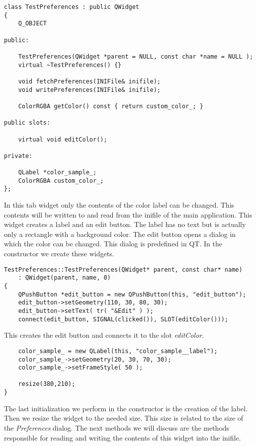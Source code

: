 \begin{verbatim}
class TestPreferences : public QWidget
{
	Q_OBJECT
		
public:

	TestPreferences(QWidget *parent = NULL, const char *name = NULL );
	virtual ~TestPreferences() {}
	
	void fetchPreferences(INIFile& inifile);
	void writePreferences(INIFile& inifile);

	ColorRGBA getColor() const { return custom_color_; }

public slots:

	virtual void editColor();

private:

	QLabel *color_sample_;
	ColorRGBA custom_color_;
};
\end{verbatim}

In this tab widget only the contents of the color label can be changed.
This contents will be written to and read from the inifile of the main application.
This widget creates a label and an edit button. The label has no text but is
actually only a rectangle with a background color. The edit button opens a dialog
in which the color can be changed. This dialog is predefined in QT.
In the constructor we create these widgets.

\begin{verbatim}
TestPreferences::TestPreferences(QWidget* parent, const char* name)
	: QWidget(parent, name, 0)
{
	QPushButton *edit_button = new QPushButton(this, "edit_button");
	edit_button->setGeometry(110, 30, 80, 30);
	edit_button->setText( tr( "&Edit" ) );
	connect(edit_button, SIGNAL(clicked()), SLOT(editColor()));
\end{verbatim}

This creates the edit button and connects it to the slot {\em editColor}.
	
\begin{verbatim}
	color_sample_ = new QLabel(this, "color_sample__label");
	color_sample_->setGeometry(20, 30, 70, 30);
	color_sample_->setFrameStyle( 50 );
	
	resize(380,210);
}
\end{verbatim}

The last initialization we perform in the constructor is the creation of the
label. Then we resize the widget to the needed size. This size is related to the
size of the {\em Preferences} dialog.
The next methods we will discuss are the methods responsible for reading and
writing the contents of this widget into the inifile.\\

